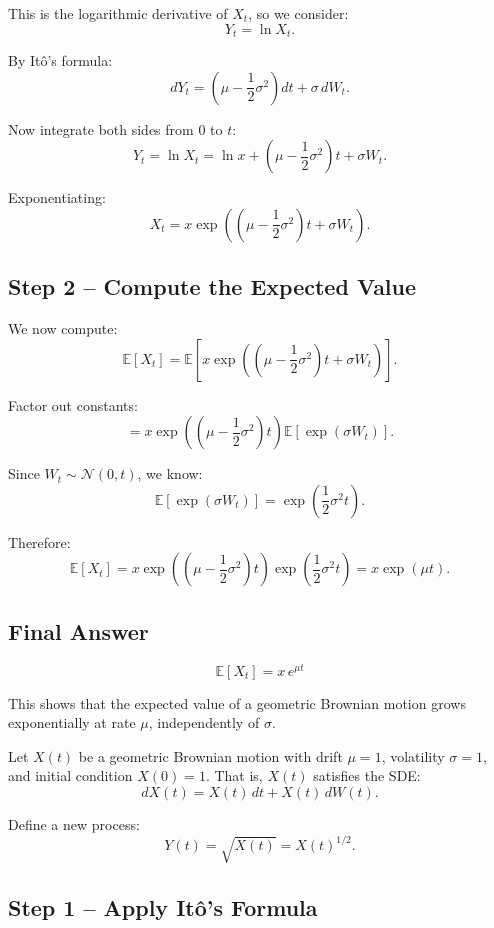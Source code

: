 This is the logarithmic derivative of \( X_t \), so we consider:
\[
Y_t = \ln X_t.
\]

By Itô’s formula:
\[
dY_t = \left(\mu - \frac{1}{2}\sigma^2\right)dt + \sigma\,dW_t.
\]

Now integrate both sides from 0 to \( t \):
\[
Y_t = \ln X_t = \ln x + \left(\mu - \frac{1}{2}\sigma^2\right)t + \sigma W_t.
\]

Exponentiating:
\[
X_t = x \exp\left( \left( \mu - \frac{1}{2} \sigma^2 \right)t + \sigma W_t \right).
\]

\subsection*{Step 2 – Compute the Expected Value}

We now compute:
\[
\mathbb{E}[X_t] = \mathbb{E}\left[ x \exp\left( \left( \mu - \frac{1}{2} \sigma^2 \right)t + \sigma W_t \right) \right].
\]

Factor out constants:
\[
= x \exp\left( \left( \mu - \frac{1}{2} \sigma^2 \right)t \right) \mathbb{E}\left[ \exp( \sigma W_t ) \right].
\]

Since \( W_t \sim \mathcal{N}(0, t) \), we know:
\[
\mathbb{E}\left[ \exp( \sigma W_t ) \right] = \exp\left( \frac{1}{2} \sigma^2 t \right).
\]

Therefore:
\[
\mathbb{E}[X_t] = x \exp\left( \left( \mu - \frac{1}{2} \sigma^2 \right)t \right) \exp\left( \frac{1}{2} \sigma^2 t \right)
= x \exp(\mu t).
\]

\subsection*{Final Answer}

\[
\boxed{ \mathbb{E}[X_t] = x\,e^{\mu t} }
\]

This shows that the expected value of a geometric Brownian motion grows exponentially at rate \( \mu \), independently of \( \sigma \).

Let \( X(t) \) be a geometric Brownian motion with drift \( \mu = 1 \), volatility \( \sigma = 1 \), and initial condition \( X(0) = 1 \). That is, \( X(t) \) satisfies the SDE:
\[
dX(t) = X(t)\,dt + X(t)\,dW(t).
\]

Define a new process:
\[
Y(t) = \sqrt{X(t)} = X(t)^{1/2}.
\]

\subsection*{Step 1 – Apply Itô's Formula}

